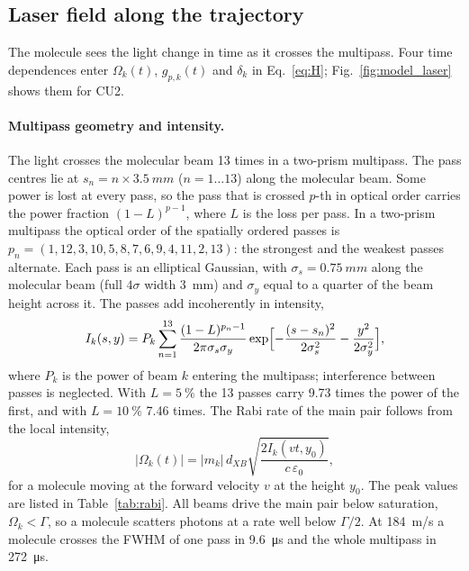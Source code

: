 \documentclass[11pt,a4paper,oneside]{report}
\newcommand{\sigs}{\sigma_{s}}
\newcommand{\sigy}{\sigma_{y}}
\begin{document}
\subsection{Laser field along the trajectory}
\label{sec:model_laser}

The molecule sees the light change in time as it crosses the multipass. Four time dependences enter
$\Omega_k(t)$, $g_{p,k}(t)$ and $\delta_k$ in Eq.~\eqref{eq:H}; Fig.~\ref{fig:model_laser} shows them
for CU2.

\paragraph{Multipass geometry and intensity.} The light crosses the molecular beam 13 times in a
two-prism multipass. The pass centres lie at $s_n=n\times\SI{3.5}{mm}$ ($n=1\ldots13$) along the
molecular beam. Some power is lost at every pass, so the pass that is crossed $p$-th in optical
order carries the power fraction $(1-L)^{p-1}$, where $L$ is the loss per pass. In a two-prism
multipass the optical order of the spatially ordered passes is $p_n=(1,12,3,10,5,8,7,6,9,4,11,2,13)$:
the strongest and the weakest passes alternate. Each pass is an elliptical Gaussian, with
$\sigs=\SI{0.75}{mm}$ along the molecular beam (full $4\sigma$ width \SI{3}{mm}) and $\sigy$ equal
to a quarter of the beam height across it. The passes add incoherently in intensity,
\begin{equation}
  I_k(s,y)=P_k\sum_{n=1}^{13}\frac{(1-L)^{p_n-1}}{2\pi\sigs\sigy}
  \exp\Bigl[-\frac{(s-s_n)^2}{2\sigs^2}-\frac{y^2}{2\sigy^2}\Bigr],
  \label{eq:intensity}
\end{equation}
where $P_k$ is the power of beam $k$ entering the multipass; interference between passes is
neglected. With $L=\SI{5}{\percent}$ the 13 passes carry 9.73 times the power of the first, and with
$L=\SI{10}{\percent}$ 7.46 times. The Rabi rate of the main pair follows from the local intensity,
\begin{equation}
  |\Omega_k(t)|=|m_k|\,d_{XB}\sqrt{\frac{2I_k(vt,y_0)}{c\,\varepsilon_0}},
  \label{eq:rabi}
\end{equation}
for a molecule moving at the forward velocity $v$ at the height $y_0$. The peak values are listed in
Table~\ref{tab:rabi}. All beams drive the main pair below saturation, $\Omega_k<\Gamma$, so a
molecule scatters photons at a rate well below $\Gamma/2$. At \SI{184}{m/s} a molecule crosses the
FWHM of one pass in \SI{9.6}{\micro s} and the whole multipass in \SI{272}{\micro s}.
\end{document}
